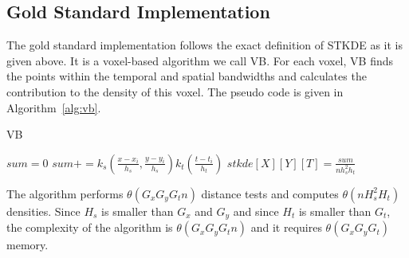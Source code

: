 \documentclass[10pt, conference, compsocconf]{IEEEtran}
\begin{document}
\subsection{Gold Standard Implementation}

The gold standard implementation follows the exact definition of STKDE
as it is given above. It is a voxel-based algorithm we call VB. For
each voxel, VB finds the points within the temporal and spatial bandwidths and calculates the contribution
to the density of this voxel. The pseudo code is given in Algorithm~\ref{alg:vb}.

\begin{algorithm}
\caption{\textsc{VB}}
\scriptsize
\begin{algorithmic}
\State $sum = 0$
    \State $sum += k_s(\frac{x-x_i}{h_s},\frac{y-y_i}{h_s}) k_t(\frac{t-t_i}{h_t})$
    \EndIf
  \EndFor
  \State $stkde[X][Y][T] = \frac{sum}{n h_s^2h_t}$
\EndFor
\end{algorithmic}
\label{alg:vb}
\end{algorithm}


The algorithm performs $\theta(G_x G_y G_t n)$ distance tests and
computes $\theta(n H_s^2 H_t )$ densities. Since $H_s$ is smaller than
$G_x$ and $G_y$ and since $H_t$ is smaller than $G_t$, the complexity of the
algorithm is $\theta(G_x G_y G_t n )$ and it requires $\theta(G_x G_y G_t)$
memory.




\end{document}
